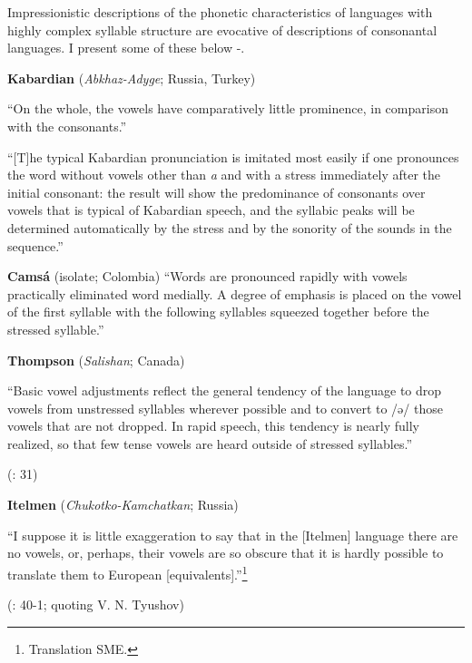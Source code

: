   Impressionistic descriptions of the phonetic characteristics of languages with highly complex syllable structure are evocative of descriptions of consonantal languages. I present some of these below -.

\ea\label{ex:(1.19)}
  \textbf{Kabardian} (\textit{Abkhaz-Adyge}; Russia, Turkey)

“On the whole, the vowels have comparatively little prominence, in comparison with the consonants.”

\citep[24]{Kuipers1960}

“[T]he typical Kabardian pronunciation is imitated most easily if one pronounces the word without vowels other than \textit{a} and with a stress immediately after the initial consonant: the result will show the predominance of consonants over vowels that is typical of Kabardian speech, and the syllabic peaks will be determined automatically by the stress and by the sonority of the sounds in the sequence.” 

\citep[43]{Kuipers1960}

\z

\ea\label{ex:(1.20)}
  \textbf{Camsá} (isolate; Colombia)
“Words are pronounced rapidly with vowels practically eliminated word medially. A degree of emphasis is placed on the vowel of the first syllable with the following syllables squeezed together before the stressed syllable.” 
\z

\citep[86-7]{Howard1967}

\ea\label{ex:(1.21)}
  \textbf{Thompson} (\textit{Salishan}; Canada)

“Basic vowel adjustments reflect the general tendency of the language to drop vowels from unstressed syllables wherever possible and to convert to /ə/ those vowels that are not dropped. In rapid speech, this tendency is nearly fully realized, so that few tense vowels are heard outside of stressed syllables.”

(\citealt{ThompsonThompson1992}: 31)
\z

\ea\label{ex:(1.22)}
  \textbf{Itelmen} (\textit{Chukotko-Kamchatkan}; Russia)

“I suppose it is little exaggeration to say that in the [Itelmen] language there are no vowels, or, perhaps, their vowels are so obscure that it is hardly possible to translate them to European [equivalents].”\footnote{ \textrm{Translation SME.}}

(\citealt{Volodin1976}: 40-1; quoting V. N. Tyushov)
\z

